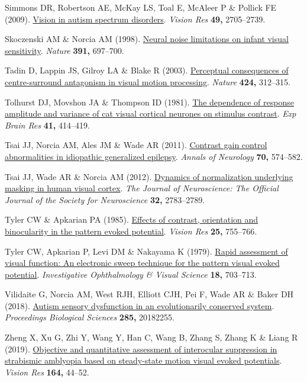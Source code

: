 \documentclass[
  letterpaper,
  DIV=11,
  numbers=noendperiod]{scrartcl}
\newlength{\cslhangindent}
\newenvironment{CSLReferences}[2] %
 {\begin{list}{}{%
  \setlength{\itemindent}{0pt}
  \setlength{\leftmargin}{0pt}
  \setlength{\parsep}{0pt}
  \ifodd #1
   \setlength{\leftmargin}{\cslhangindent}
   \setlength{\itemindent}{-1\cslhangindent}
  \fi
  \setlength{\itemsep}{#2\baselineskip}}}
 {\end{list}}
\begin{document}
\begin{CSLReferences}{1}{1}
Simmons DR, Robertson AE, McKay LS, Toal E, McAleer P \& Pollick FE
(2009). \href{https://doi.org/10.1016/j.visres.2009.08.005}{Vision in
autism spectrum disorders}. \emph{Vision Res} \textbf{49,} 2705--2739.

Skoczenski AM \& Norcia AM (1998).
\href{https://doi.org/10.1038/35630}{Neural noise limitations on infant
visual sensitivity}. \emph{Nature} \textbf{391,} 697--700.

Tadin D, Lappin JS, Gilroy LA \& Blake R (2003).
\href{https://doi.org/10.1038/nature01800}{Perceptual consequences of
centre-surround antagonism in visual motion processing}. \emph{Nature}
\textbf{424,} 312--315.

Tolhurst DJ, Movshon JA \& Thompson ID (1981).
\href{https://doi.org/10.1007/BF00238900}{The dependence of response
amplitude and variance of cat visual cortical neurones on stimulus
contrast}. \emph{Exp Brain Res} \textbf{41,} 414--419.

Tsai JJ, Norcia AM, Ales JM \& Wade AR (2011).
\href{https://doi.org/10.1002/ana.22462}{Contrast gain control
abnormalities in idiopathic generalized epilepsy}. \emph{Annals of
Neurology} \textbf{70,} 574--582.

Tsai JJ, Wade AR \& Norcia AM (2012).
\href{https://doi.org/10.1523/JNEUROSCI.4485-11.2012}{Dynamics of
normalization underlying masking in human visual cortex}. \emph{The
Journal of Neuroscience: The Official Journal of the Society for
Neuroscience} \textbf{32,} 2783--2789.

Tyler CW \& Apkarian PA (1985).
\href{https://doi.org/10.1016/0042-6989(85)90183-x}{Effects of contrast,
orientation and binocularity in the pattern evoked potential}.
\emph{Vision Res} \textbf{25,} 755--766.

Tyler CW, Apkarian P, Levi DM \& Nakayama K (1979).
\href{https://www.ncbi.nlm.nih.gov/pubmed/447469}{Rapid assessment of
visual function: An electronic sweep technique for the pattern visual
evoked potential}. \emph{Investigative Ophthalmology \& Visual Science}
\textbf{18,} 703--713.

Vilidaite G, Norcia AM, West RJH, Elliott CJH, Pei F, Wade AR \& Baker
DH (2018). \href{https://doi.org/10.1098/rspb.2018.2255}{Autism sensory
dysfunction in an evolutionarily conserved system}. \emph{Proceedings
Biological Sciences} \textbf{285,} 20182255.

Zheng X, Xu G, Zhi Y, Wang Y, Han C, Wang B, Zhang S, Zhang K \& Liang R
(2019). \href{https://doi.org/10.1016/j.visres.2019.07.003}{Objective
and quantitative assessment of interocular suppression in strabismic
amblyopia based on steady-state motion visual evoked potentials}.
\emph{Vision Res} \textbf{164,} 44--52.

\end{CSLReferences}
\end{document}
